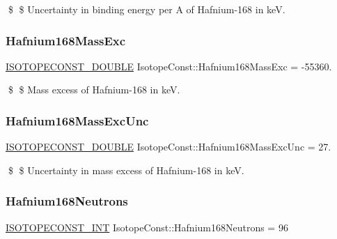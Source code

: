 \$ \$ Uncertainty in binding energy per A of Hafnium-\/168 in keV. \mbox{\label{group___isotope_const-_hafnium-_hf168_ga23c3332d4843243c8721a6df3685ef3b}} 
\subsubsection{\texorpdfstring{Hafnium168\+Mass\+Exc}{Hafnium168MassExc}}
{\footnotesize\ttfamily \mbox{\hyperlink{group___isotope_const-_macros_ga8f45a7272ce02c0b4c65c44636ed719a}{I\+S\+O\+T\+O\+P\+E\+C\+O\+N\+S\+T\+\_\+\+D\+O\+U\+B\+LE}} Isotope\+Const\+::\+Hafnium168\+Mass\+Exc = -\/55360.}

\$ \$ Mass excess of Hafnium-\/168 in keV. \mbox{\label{group___isotope_const-_hafnium-_hf168_gaeac77d4efcf246d5d16d2839edf24bdf}} 
\subsubsection{\texorpdfstring{Hafnium168\+Mass\+Exc\+Unc}{Hafnium168MassExcUnc}}
{\footnotesize\ttfamily \mbox{\hyperlink{group___isotope_const-_macros_ga8f45a7272ce02c0b4c65c44636ed719a}{I\+S\+O\+T\+O\+P\+E\+C\+O\+N\+S\+T\+\_\+\+D\+O\+U\+B\+LE}} Isotope\+Const\+::\+Hafnium168\+Mass\+Exc\+Unc = 27.}

\$ \$ Uncertainty in mass excess of Hafnium-\/168 in keV. \mbox{\label{group___isotope_const-_hafnium-_hf168_ga06313501d1731368df2c58fc7785b8b4}} 
\subsubsection{\texorpdfstring{Hafnium168\+Neutrons}{Hafnium168Neutrons}}
{\footnotesize\ttfamily \mbox{\hyperlink{group___isotope_const-_macros_ga5f18360b3e99483a35c32d789e62621c}{I\+S\+O\+T\+O\+P\+E\+C\+O\+N\+S\+T\+\_\+\+I\+NT}} Isotope\+Const\+::\+Hafnium168\+Neutrons = 96}

